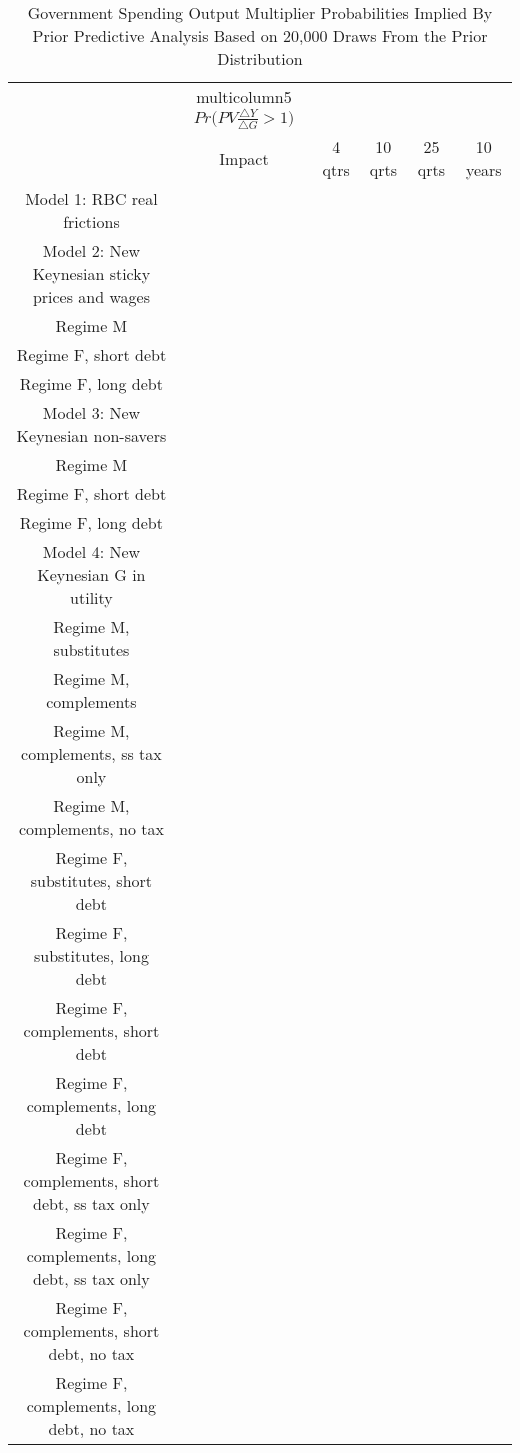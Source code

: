 \documentclass[letterpaper,12pt]{article}%
\begin{document}
\begin{table}[H]
    \centering
    \caption{Government Spending Output Multiplier Probabilities Implied By Prior Predictive Analysis Based on 20,000 Draws From the Prior Distribution}
    \begin{tabular}{c c c c c c}
    \toprule
        & multicolumn{5}{$Pr\Big(PV \frac{\triangle Y}{\triangle G}>1\Big)$}\\
        & Impact & 4 qtrs & 10 qrts & 25 qrts & 10 years \\
     Model 1: RBC real frictions &    &   &   &   &  \\
     Model 2: New Keynesian sticky prices and wages    &    &   &   &   &  \\
     \quad Regime M &    &   &   &   &  \\
     \quad Regime F, short debt &    &   &   &   &  \\
     \quad Regime F, long debt &    &   &   &   &  \\
     Model 3: New Keynesian non-savers &    &   &   &   &  \\
     \quad Regime M &    &   &   &   &  \\
     \quad Regime F, short debt &    &   &   &   &  \\
     \quad Regime F, long debt &    &   &   &   &  \\
     Model 4: New Keynesian G in utility &    &   &   &   &  \\
     \quad Regime M, substitutes &    &   &   &   &  \\
     \quad Regime M, complements &    &   &   &   &  \\
     \quad Regime M, complements, ss tax only &    &   &   &   &  \\
     \quad Regime M, complements, no tax &    &   &   &   &  \\
     \quad Regime F, substitutes, short debt &    &   &   &   &  \\
     \quad Regime F, substitutes, long debt &    &   &   &   &  \\
     \quad Regime F, complements, short debt &    &   &   &   &  \\
     \quad Regime F, complements, long debt &    &   &   &   &  \\
     \quad Regime F, complements, short debt, ss tax only &    &   &   &   &  \\
     \quad Regime F, complements, long debt, ss tax only &    &   &   &   &  \\
     \quad Regime F, complements, short debt, no tax &    &   &   &   &  \\
     \quad Regime F, complements, long debt, no tax &    &   &   &   &  \\
     \midrule
    \bottomrule    
    \end{tabular}
    \label{tab:PPAOutputMultipliers}
\end{table}
\end{document}
